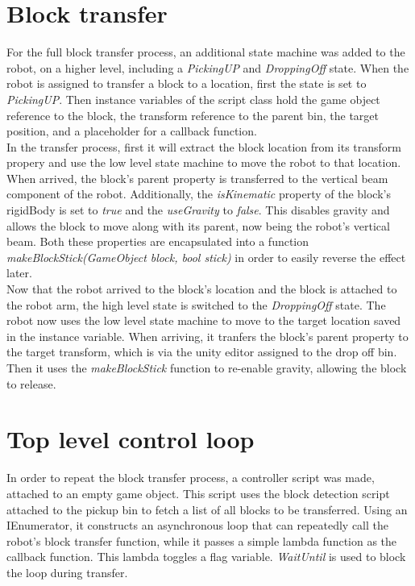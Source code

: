\documentclass{report}
\begin{document}
\section{ Block transfer}
For the full block transfer process, an additional state machine was added to the robot, on a higher level, including a \textit{PickingUP} and \textit{DroppingOff} state.
When the robot is assigned to transfer a block to a location, first the state is set to \textit{PickingUP}. Then instance variables of the script class hold the game object reference to the block, the transform reference to the parent bin, the target position, and a placeholder for a callback function.\\
In the transfer process, first it will extract the block location from its transform propery and use the low level state machine to move the robot to that location. When arrived, the block's parent property is transferred to the vertical beam component of the robot. Additionally, the \textit{isKinematic} property of the block's rigidBody is set to \textit{true} and the \textit{useGravity} to \textit{false}. This disables gravity and allows the block to move along with its parent, now being the robot's vertical beam. Both these properties are encapsulated into a function \textit{makeBlockStick(GameObject block, bool stick)} in order to easily reverse the effect later.\\
\newline
Now that the robot arrived to the block's location and the block is attached to the robot arm, the high level state is switched to the \textit{DroppingOff} state. The robot now uses the low level state machine to move to the target location saved in the instance variable. When arriving, it tranfers the block's parent property to the target transform, which is via the unity editor assigned to the drop off bin. Then it uses the \textit{makeBlockStick} function to re-enable gravity, allowing the block to release.

\section{Top level control loop}

In order to repeat the block transfer process, a controller script was made, attached to an empty game object. This script uses the block detection script attached to the pickup bin to fetch a list of all blocks to be transferred. Using an IEnumerator, it constructs an asynchronous loop that can repeatedly call the robot's block transfer function, while it passes a simple lambda function as the callback function. This lambda toggles a flag variable. \textit{WaitUntil} is used to block the loop during transfer.
\end{document}
